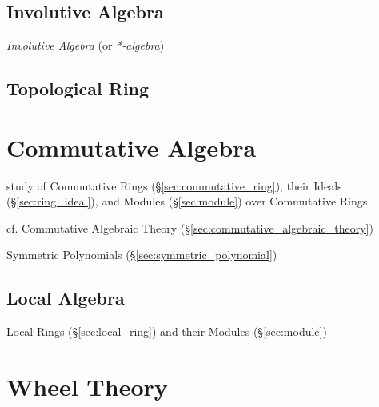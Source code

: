 \subsection{Involutive Algebra}\label{sec:involutive_algebra}

\emph{Involutive Algebra} (or \emph{*-algebra})



\subsection{Topological Ring}\label{sec:topological_ring}



\section{Commutative Algebra}\label{sec:commutative_algebra}

study of Commutative Rings (\S\ref{sec:commutative_ring}), their Ideals
(\S\ref{sec:ring_ideal}), and Modules (\S\ref{sec:module}) over Commutative
Rings

\fist cf. Commutative Algebraic Theory
(\S\ref{sec:commutative_algebraic_theory})

\fist Symmetric Polynomials (\S\ref{sec:symmetric_polynomial})



\subsection{Local Algebra}\label{sec:local_algebra}

Local Rings (\S\ref{sec:local_ring}) and their Modules (\S\ref{sec:module})



\section{Wheel Theory}\label{sec:wheel_theory}

